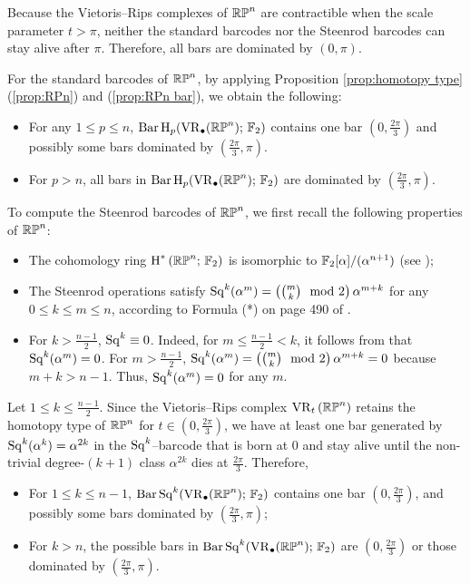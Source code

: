 \begin{example}
Because the Vietoris--Rips complexes of $\mathbb{RP}^n$ are contractible when the scale parameter $t>\pi$, neither the standard barcodes nor the Steenrod barcodes can stay alive after $\pi$. Therefore, all bars are dominated by $(0,\pi)$. 

For the standard barcodes of $\mathbb{RP}^n$, by applying Proposition \ref{prop:homotopy type} (\ref{prop:RPn}) and (\ref{prop:RPn bar}), %
we obtain the following:
\begin{itemize}
    \item For any $1\leq p\leq n$, $\operatorname{Bar} \operatorname{H}_{p}(\operatorname{VR}_\bullet(\mathbb{RP}^n);\,{\mathbb{F}_2})$ contains one bar $\left(0,\frac{2\pi}{3}\right)$ and possibly some bars  dominated by $\left(\frac{2\pi}{3},\pi\right)$. 
    \item For $p>n$, all bars in $\operatorname{Bar} \operatorname{H}_{p}(\operatorname{VR}_\bullet(\mathbb{RP}^n);\,{\mathbb{F}_2})$ are dominated by $\left(\frac{2\pi}{3},\pi\right)$.
\end{itemize}

To compute the Steenrod barcodes of $\mathbb{RP}^n$, we first recall the following properties of $\mathbb{RP}^n$:
\begin{itemize}
    \item The cohomology ring $\operatorname{H}^*\left(\mathbb{RP}^n;\,{\mathbb{F}_2}\right)$ is isomorphic to ${\mathbb{F}_2}[\alpha]/(\alpha^{n+1})$ (see \cite[Theorem 3.19]{hatcher2000}); 
    \item The Steenrod operations satisfy $\operatorname{Sq}^k(\alpha^m)=\left({m \choose k} \mod 2\right)\alpha^{m+k}$ for any $0\leq k\leq m\leq n$, according to Formula (*) on page 490 of \cite{hatcher2000}. 
    \item For $k>\frac{n-1}{2}$, $\operatorname{Sq}^k\equiv 0$. Indeed, for $m\leq \frac{n-1}{2}<k$, it follows from \cite[page 489, Item (5)]{hatcher2000} that $\operatorname{Sq}^k(\alpha^m)=0$. For $m> \frac{n-1}{2}$, $\operatorname{Sq}^k(\alpha^m)=\left({m \choose k} \mod 2\right)\alpha^{m+k}=0$ because $m+k>n-1.$ Thus, $\operatorname{Sq}^k(\alpha^m)=0$ for any $m$.
\end{itemize}
Let $1\leq k\leq \frac{n-1}{2}$. Since the Vietoris--Rips complex $\operatorname{VR}_t\left(\mathbb{RP}^n\right)$ retains the homotopy type of $\mathbb{RP}^n$ for $t\in \left(0,\frac{2\pi}{3}\right)$, we have at least one bar generated by $\operatorname{Sq}^k(\alpha^k)=\alpha^{2k}$ in the $\operatorname{Sq}^k$--barcode that is born at $0$ and stay alive until the non-trivial degree-$(k+1)$ class $\alpha^{2k}$ dies at $\frac{2\pi}{3}$. Therefore, 
\begin{itemize}
    \item For $1\leq k\leq n-1$, $\operatorname{Bar}\operatorname{Sq}^{k}(\operatorname{VR}_\bullet(\mathbb{RP}^n);\,{\mathbb{F}_2})$ contains one bar $\left(0,\frac{2\pi}{3}\right)$, and possibly some bars dominated by $\left(\frac{2\pi}{3},\pi\right)$; 
    \item For $k>n$, the possible bars in $\operatorname{Bar}\operatorname{Sq}^{k}(\operatorname{VR}_\bullet(\mathbb{RP}^n);\,{\mathbb{F}_2})$ are $\left(0,\frac{2\pi}{3}\right)$ or those dominated by $\left(\frac{2\pi}{3},\pi\right)$.
\end{itemize}
\end{example}

